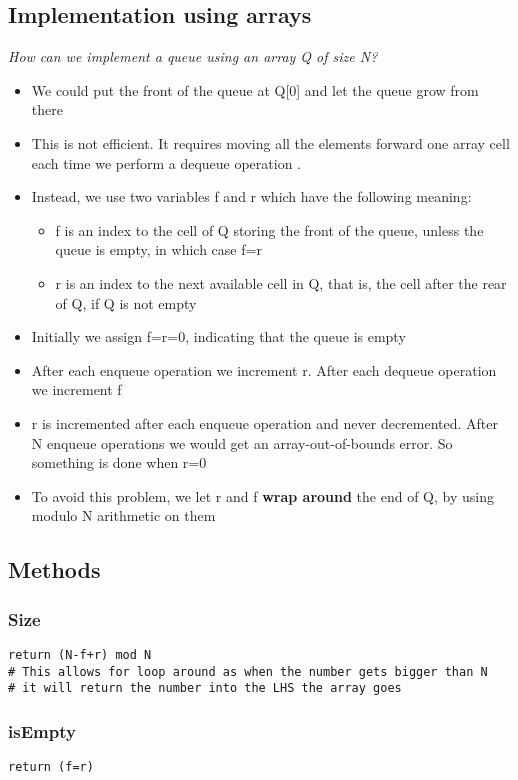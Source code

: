 \documentclass{article}[18pt]
\begin{document}
\subsection{Implementation using arrays}
\textit{How can we implement a queue using an array Q of size N?}
\begin{itemize}
\item We could put the front of the queue at Q[0] and let the queue grow from there
\item This is not efficient. It requires moving all the elements forward one array cell each time we perform a dequeue operation .
\item Instead, we use two variables f and r which have the following meaning:
\begin{itemize}
\item f is an index to the cell of Q storing the front of the queue, unless the queue is empty, in which case f=r
\item r is an index to the next available cell in Q, that is, the cell after the rear of Q, if Q is not empty
\end{itemize}
\item Initially we assign f=r=0, indicating that the queue is empty
\item After each enqueue operation we increment r. After each dequeue operation we increment f
\item r is incremented after each enqueue operation and never decremented. After N enqueue operations we would get an array-out-of-bounds error. So something is done when r=0
\item To avoid this problem, we let r and f \textbf{wrap around} the end of Q, by using modulo N  arithmetic on them
\end{itemize}
\subsection{Methods}
\subsubsection{Size}
\begin{lstlisting}[mathescape=true]
return (N-f+r) mod N
# This allows for loop around as when the number gets bigger than N 
# it will return the number into the LHS the array goes
\end{lstlisting}
\subsubsection{isEmpty}
\begin{lstlisting}[mathescape=true]
return (f=r)
\end{lstlisting}
\end{document}
